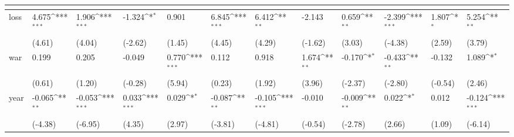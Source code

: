 \def\sym#1{\ifmmode^{#1}\else\(^{#1}\)\fi}
\begin{tabular}{p{1.5cm} p{2cm} p{1.7cm} p{1.7cm} p{1.7cm} p{1.7cm} p{1.7cm} p{1.7cm} p{1.7cm} p{1.7cm} p{1.7cm} p{1.7cm}}
                &&&&&&&&&&&\\
\hline
loss            &    4.675\sym{***}&    1.906\sym{***}&   -1.324\sym{*}  &    0.901         &    6.845\sym{***}&    6.412\sym{**} &   -2.143         &    0.659\sym{**} &   -2.399\sym{***}&    1.807\sym{*}  &    5.254\sym{**} \\
                &   (4.61)         &   (4.04)         &  (-2.62)         &   (1.45)         &   (4.45)         &   (4.29)         &  (-1.62)         &   (3.03)         &  (-4.38)         &   (2.59)         &   (3.79)         \\
war             &    0.199         &    0.205         &   -0.049         &    0.770\sym{***}&    0.112         &    0.918         &    1.674\sym{**} &   -0.170\sym{*}  &   -0.433\sym{**} &   -0.132         &    1.089\sym{*}  \\
                &   (0.61)         &   (1.20)         &  (-0.28)         &   (5.94)         &   (0.23)         &   (1.92)         &   (3.96)         &  (-2.37)         &  (-2.80)         &  (-0.54)         &   (2.46)         \\
year            &   -0.065\sym{**} &   -0.053\sym{***}&    0.033\sym{***}&    0.029\sym{*}  &   -0.087\sym{**} &   -0.105\sym{***}&   -0.010         &   -0.009\sym{**} &    0.022\sym{*}  &    0.012         &   -0.124\sym{***}\\
                &  (-4.38)         &  (-6.95)         &   (4.35)         &   (2.97)         &  (-3.81)         &  (-4.81)         &  (-0.54)         &  (-2.78)         &   (2.66)         &   (1.09)         &  (-6.14)         \\
\end{tabular}
